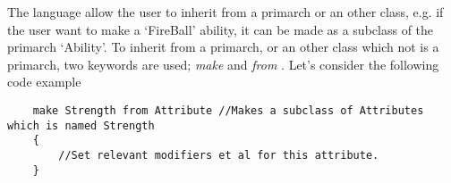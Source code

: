 The language allow the user to inherit from a primarch or an other class, e.g. if the user want to make a `FireBall' ability, it can be made as a subclass of the primarch `Ability'. To inherit from a primarch, or an other class which not is a primarch, two keywords are used; \emph{make} and \emph{from} .
Let's consider the following code example
\begin{lstlisting}
	make Strength from Attribute //Makes a subclass of Attributes which is named Strength
	{
		//Set relevant modifiers et al for this attribute.
	}
\end{lstlisting}

